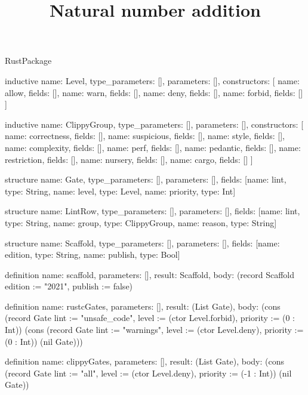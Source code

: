 \begin{lexlean}{RustPackage}
\title{Natural number addition}
\begin{semanticmodule}
inductive{
  name: Level,
  type_parameters: [],
  parameters: [],
  constructors: [
    {name: allow, fields: []},
    {name: warn, fields: []},
    {name: deny, fields: []},
    {name: forbid, fields: []}
  ]
}

inductive{
  name: ClippyGroup,
  type_parameters: [],
  parameters: [],
  constructors: [
    {name: correctness, fields: []},
    {name: suspicious, fields: []},
    {name: style, fields: []},
    {name: complexity, fields: []},
    {name: perf, fields: []},
    {name: pedantic, fields: []},
    {name: restriction, fields: []},
    {name: nursery, fields: []},
    {name: cargo, fields: []}
  ]
}

structure{
  name: Gate,
  type_parameters: [],
  parameters: [],
  fields: [{name: lint, type: String}, {name: level, type: Level}, {name: priority, type: Int}]
}

structure{
  name: LintRow,
  type_parameters: [],
  parameters: [],
  fields: [{name: lint, type: String}, {name: group, type: ClippyGroup}, {name: reason, type: String}]
}

structure{
  name: Scaffold,
  type_parameters: [],
  parameters: [],
  fields: [{name: edition, type: String}, {name: publish, type: Bool}]
}

definition{
  name: scaffold,
  parameters: [],
  result: Scaffold,
  body: (record Scaffold {edition := "2021", publish := false})
}

definition{
  name: rustcGates,
  parameters: [],
  result: (List Gate),
  body: (cons (record Gate {lint := "unsafe_code", level := (ctor Level.forbid), priority := (0 : Int)}) (cons (record Gate {lint := "warnings", level := (ctor Level.deny), priority := (0 : Int)}) (nil Gate)))
}

definition{
  name: clippyGates,
  parameters: [],
  result: (List Gate),
  body: (cons (record Gate {lint := "all", level := (ctor Level.deny), priority := (-1 : Int)}) (nil Gate))
}


\end{semanticmodule}
\end{lexlean}
